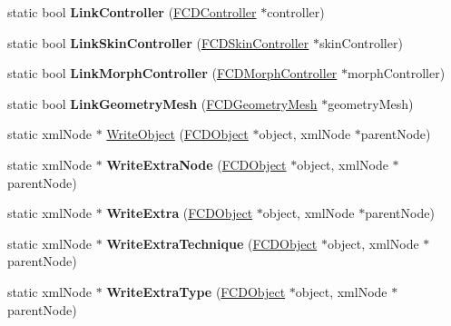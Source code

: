 \begin{DoxyCompactItemize}
\item 
\hypertarget{classFArchiveXML_a5fee7c3ab0e0952e722c92a02cc96363}{
static bool {\bfseries LinkController} (\hyperlink{classFCDController}{FCDController} $\ast$controller)}
\label{classFArchiveXML_a5fee7c3ab0e0952e722c92a02cc96363}

\item 
\hypertarget{classFArchiveXML_a2a33aca1e78c523f54ca69efa136e08a}{
static bool {\bfseries LinkSkinController} (\hyperlink{classFCDSkinController}{FCDSkinController} $\ast$skinController)}
\label{classFArchiveXML_a2a33aca1e78c523f54ca69efa136e08a}

\item 
\hypertarget{classFArchiveXML_a79eb4da1ff65e11e1f0b56f2f9f5ed2f}{
static bool {\bfseries LinkMorphController} (\hyperlink{classFCDMorphController}{FCDMorphController} $\ast$morphController)}
\label{classFArchiveXML_a79eb4da1ff65e11e1f0b56f2f9f5ed2f}

\item 
\hypertarget{classFArchiveXML_a888d8c4cf531152d2f919bfdc67a4bc7}{
static bool {\bfseries LinkGeometryMesh} (\hyperlink{classFCDGeometryMesh}{FCDGeometryMesh} $\ast$geometryMesh)}
\label{classFArchiveXML_a888d8c4cf531152d2f919bfdc67a4bc7}

\item 
static xmlNode $\ast$ \hyperlink{classFArchiveXML_aa13b1e22f3b07d1323b3961d3e6b4ada}{WriteObject} (\hyperlink{classFCDObject}{FCDObject} $\ast$object, xmlNode $\ast$parentNode)
\item 
\hypertarget{classFArchiveXML_a79f1ae05b3aea45004211bd02a093966}{
static xmlNode $\ast$ {\bfseries WriteExtraNode} (\hyperlink{classFCDObject}{FCDObject} $\ast$object, xmlNode $\ast$parentNode)}
\label{classFArchiveXML_a79f1ae05b3aea45004211bd02a093966}

\item 
\hypertarget{classFArchiveXML_a4ec98e3e1b99d04e2e4def4817184426}{
static xmlNode $\ast$ {\bfseries WriteExtra} (\hyperlink{classFCDObject}{FCDObject} $\ast$object, xmlNode $\ast$parentNode)}
\label{classFArchiveXML_a4ec98e3e1b99d04e2e4def4817184426}

\item 
\hypertarget{classFArchiveXML_a2835381fb0d57fb58b4cdf9a48ab51e5}{
static xmlNode $\ast$ {\bfseries WriteExtraTechnique} (\hyperlink{classFCDObject}{FCDObject} $\ast$object, xmlNode $\ast$parentNode)}
\label{classFArchiveXML_a2835381fb0d57fb58b4cdf9a48ab51e5}

\item 
\hypertarget{classFArchiveXML_a8ce4a97e018d56ed68f44aa32d0d527d}{
static xmlNode $\ast$ {\bfseries WriteExtraType} (\hyperlink{classFCDObject}{FCDObject} $\ast$object, xmlNode $\ast$parentNode)}
\label{classFArchiveXML_a8ce4a97e018d56ed68f44aa32d0d527d}


\end{DoxyCompactItemize}
